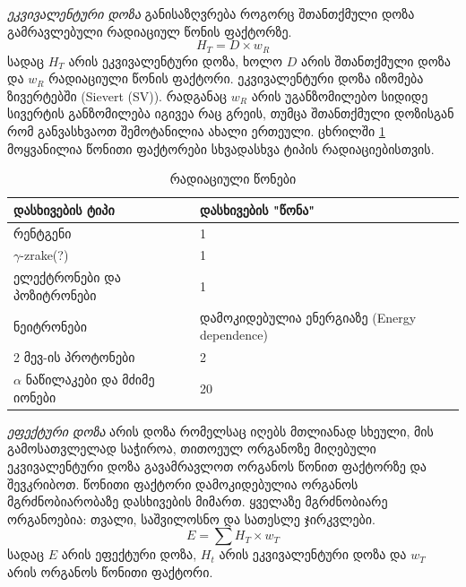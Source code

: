\documentclass[12pt,a4paper,]{report}
\begin{document}
\textit{ეკვივალენტური დოზა} განისაზღვრება როგორც შთანთქმული დოზა გამრავლებული რადიაციულ წონის ფაქტორზე.
	\begin{equation}
		H_T = D \times w_R
	\end{equation}
სადაც $H_T$ არის ეკვივალენტური დოზა, ხოლო $D$ არის შთანთქმული დოზა და $w_R$ რადიაციული წონის ფაქტორი. ეკვივალენტური დოზა იზომება ზივერტებში (Sievert (SV)). რადგანაც $w_R$ არის უგანზომილებო სიდიდე სივერტის განზომილება იგივეა რაც გრეის, თუმცა შთანთქმული დოზისგან რომ განვასხვაოთ შემოტანილია ახალი ერთეული. ცხრილში \ref{tab:rad_weight_factor} მოყვანილია წონითი ფაქტორები სხვადასხვა ტიპის რადიაციებისთვის. 
    \begin{table}[h]
        \centering
        \begin{tabular}{l | l}
             დასხივების ტიპი & დასხივების "წონა" \\
             \hline
             \hline
             რენტგენი & 1 \\
             $\gamma$-zrake(?) & 1 \\
             ელექტრონები და პოზიტრონები & 1 \\
             ნეიტრონები & დამოკიდებულია ენერგიაზე (Energy dependence) \\
             2 მევ-ის პროტონები & 2 \\
             $\alpha$ ნაწილაკები და მძიმე იონები & 20 \\
        \end{tabular}
        \caption{რადიაციული წონები}
        \label{tab:rad_weight_factor}
    \end{table}
    
\textit{ეფექტური დოზა} არის დოზა რომელსაც იღებს მთლიანად სხეული, მის გამოსათვლელად საჭიროა, თითოეულ ორგანოზე მიღებული ეკვივალენტური დოზა გავამრავლოთ ორგანოს წონით ფაქტორზე და შევკრიბოთ. წონითი ფაქტორი დამოკიდებულია ორგანოს მგრძნობიარობაზე დასხივების მიმართ. ყველაზე მგრძნობიარე ორგანოებია: თვალი, საშვილოსნო და სათესლე ჯირკვლები.
	\begin{equation}
		E = \sum H_T \times w_T
	\end{equation}
სადაც $E$ არის ეფექტური დოზა,  $H_t$ არის ეკვივალენტური დოზა და $w_T$ არის ორგანოს წონითი ფაქტორი. 
\end{document}
